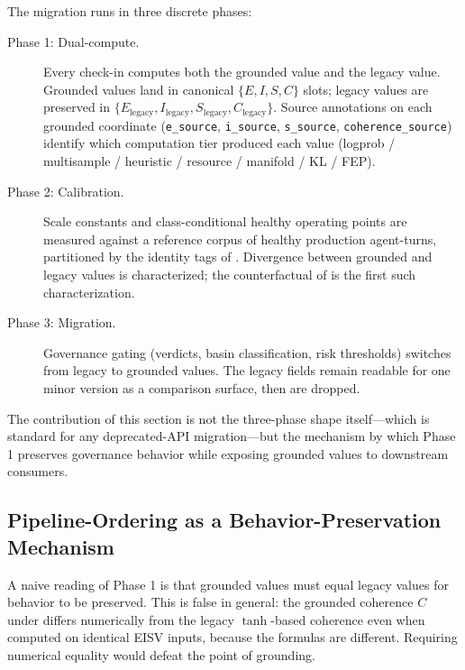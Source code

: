 \documentclass[11pt,twocolumn]{article}
\begin{document}
The migration runs in three discrete phases:

\begin{description}
\item[Phase 1: Dual-compute.]
  Every check-in computes both the grounded value and the legacy
  value. Grounded values land in canonical
  $\{E, I, S, C\}$ slots; legacy values are preserved in
  $\{E_{\text{legacy}}, I_{\text{legacy}}, S_{\text{legacy}},
  C_{\text{legacy}}\}$. Source annotations on each grounded
  coordinate (\texttt{e\_source}, \texttt{i\_source},
  \texttt{s\_source}, \texttt{coherence\_source}) identify which
  computation tier produced each value (logprob / multisample /
  heuristic / resource / manifold / KL / FEP).
\item[Phase 2: Calibration.]
  Scale constants and class-conditional healthy operating points
  are measured against a reference corpus of healthy production
  agent-turns, partitioned by the identity tags of
  . Divergence between grounded and
  legacy values is characterized; the counterfactual of
   is the first such
  characterization.
\item[Phase 3: Migration.]
  Governance gating (verdicts, basin classification, risk
  thresholds) switches from legacy to grounded values. The
  legacy fields remain readable for one minor version as a
  comparison surface, then are dropped.
\end{description}

The contribution of this section is not the three-phase shape
itself---which is standard for any deprecated-API migration---but
the mechanism by which Phase 1 preserves governance behavior while
exposing grounded values to downstream consumers.

\subsection{Pipeline-Ordering as a Behavior-Preservation Mechanism}
\label{sec:pipeline-ordering}

A naive reading of Phase 1 is that grounded values must equal
legacy values for behavior to be preserved. This is false in
general: the grounded coherence $C$ under 
differs numerically from the legacy
$\tanh$-based coherence even when computed on identical EISV
inputs, because the formulas are different. Requiring numerical
equality would defeat the point of grounding.
\end{document}
